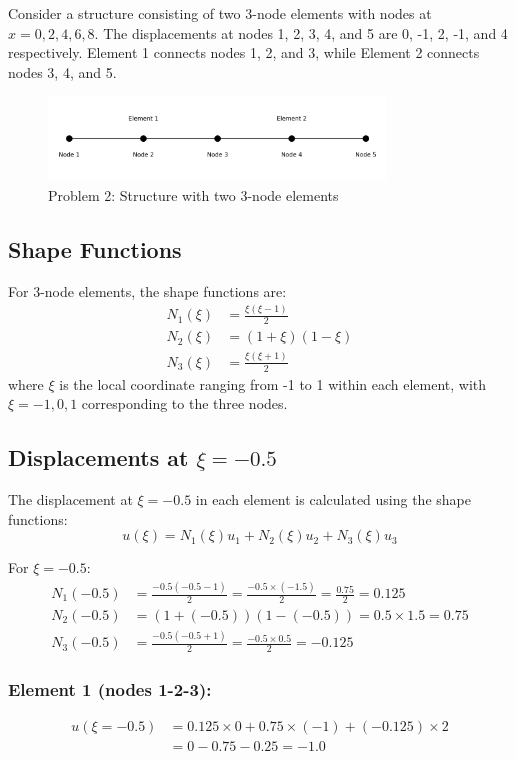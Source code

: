 \documentclass[12pt,a4paper]{article}
\begin{document}
Consider a structure consisting of two 3-node elements with nodes at $x = 0, 2, 4, 6, 8$. The displacements at nodes 1, 2, 3, 4, and 5 are 0, -1, 2, -1, and 4 respectively. Element 1 connects nodes 1, 2, and 3, while Element 2 connects nodes 3, 4, and 5.

\begin{figure}[H]
\centering
\includegraphics[width=0.8\textwidth]{figures/problem2_structure.png}
\caption{Problem 2: Structure with two 3-node elements}
\label{fig:problem2_structure}
\end{figure}

\subsection{Shape Functions}
For 3-node elements, the shape functions are:
\begin{align}
N_1(\xi) &= \frac{\xi(\xi-1)}{2} \\
N_2(\xi) &= (1+\xi)(1-\xi) \\
N_3(\xi) &= \frac{\xi(\xi+1)}{2}
\end{align}
where $\xi$ is the local coordinate ranging from -1 to 1 within each element, with $\xi = -1, 0, 1$ corresponding to the three nodes.

\subsection{Displacements at $\xi = -0.5$}
The displacement at $\xi = -0.5$ in each element is calculated using the shape functions:
\begin{equation}
u(\xi) = N_1(\xi)u_1 + N_2(\xi)u_2 + N_3(\xi)u_3
\end{equation}

For $\xi = -0.5$:
\begin{align}
N_1(-0.5) &= \frac{-0.5(-0.5-1)}{2} = \frac{-0.5 \times (-1.5)}{2} = \frac{0.75}{2} = 0.125 \\
N_2(-0.5) &= (1+(-0.5))(1-(-0.5)) = 0.5 \times 1.5 = 0.75 \\
N_3(-0.5) &= \frac{-0.5(-0.5+1)}{2} = \frac{-0.5 \times 0.5}{2} = -0.125
\end{align}

\subsubsection*{Element 1 (nodes 1-2-3):}
\begin{align}
u(\xi=-0.5) &= 0.125 \times 0 + 0.75 \times (-1) + (-0.125) \times 2 \\
&= 0 - 0.75 - 0.25 = -1.0
\end{align}
\end{document}
